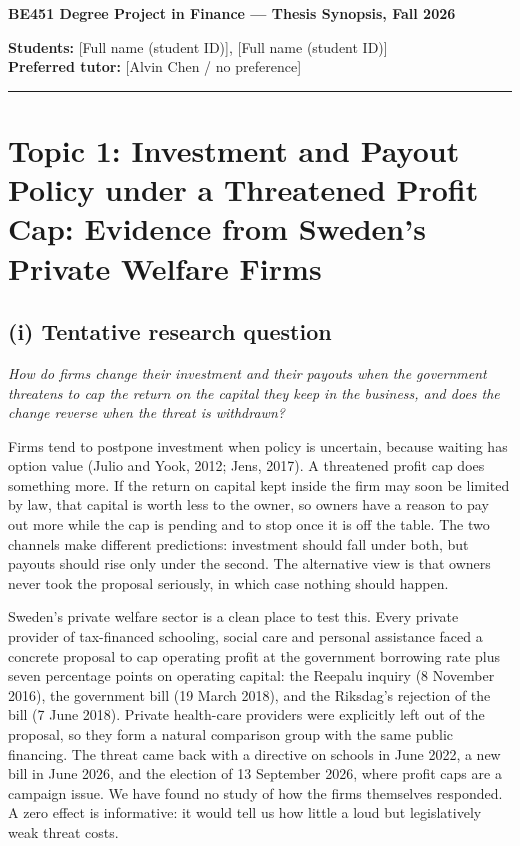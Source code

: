 \documentclass[12pt,a4paper]{article}
\begin{document}
{\large\bfseries BE451 Degree Project in Finance --- Thesis Synopsis, Fall 2026}

\textbf{Students:} [Full name (student ID)], [Full name (student ID)] \\
\textbf{Preferred tutor:} [Alvin Chen / no preference]

\vspace{4pt}\hrule\vspace{4pt}

\section{Topic 1: Investment and Payout Policy under a Threatened Profit Cap: Evidence from Sweden's Private Welfare Firms}

\subsection{(i) Tentative research question}

\emph{How do firms change their investment and their payouts when the government threatens to cap the return on the capital they keep in the business, and does the change reverse when the threat is withdrawn?}

Firms tend to postpone investment when policy is uncertain, because waiting has option value (Julio and Yook, 2012; Jens, 2017). A threatened profit cap does something more. If the return on capital kept inside the firm may soon be limited by law, that capital is worth less to the owner, so owners have a reason to pay out more while the cap is pending and to stop once it is off the table. The two channels make different predictions: investment should fall under both, but payouts should rise only under the second. The alternative view is that owners never took the proposal seriously, in which case nothing should happen.

Sweden's private welfare sector is a clean place to test this. Every private provider of tax-financed schooling, social care and personal assistance faced a concrete proposal to cap operating profit at the government borrowing rate plus seven percentage points on operating capital: the Reepalu inquiry (8 November 2016), the government bill (19 March 2018), and the Riksdag's rejection of the bill (7 June 2018). Private health-care providers were explicitly left out of the proposal, so they form a natural comparison group with the same public financing. The threat came back with a directive on schools in June 2022, a new bill in June 2026, and the election of 13 September 2026, where profit caps are a campaign issue. We have found no study of how the firms themselves responded. A zero effect is informative: it would tell us how little a loud but legislatively weak threat costs.
\end{document}
